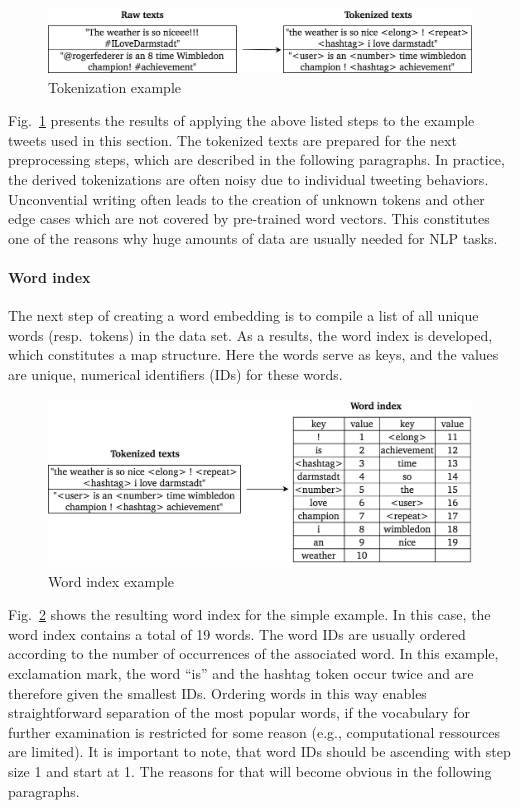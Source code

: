 \begin{figure}[h]
  \includegraphics[width=\textwidth]{img/text_preprocessing_1}
  \caption{Tokenization example}
\label{fig:tokenization}
\end{figure}

Fig.~\ref{fig:tokenization} presents the results of applying the above listed
steps to the example tweets used in this section.
The tokenized texts are prepared for the next preprocessing steps, which
are described in the following paragraphs.
In practice, the derived tokenizations are often noisy due to individual tweeting
behaviors.
Unconvential writing often leads to the creation of unknown tokens and other
edge cases which are not covered by pre-trained word vectors.
This constitutes one of the reasons why huge amounts of data are usually needed
for NLP tasks.

\paragraph{Word index}
\label{sub:word_index}

The next step of creating a word embedding is to compile a list of all unique
words (resp.\ tokens) in the data set.
As a results, the word index is developed, which constitutes a map structure.
Here the words serve as keys, and the values are unique, numerical identifiers
(IDs) for these words.

\begin{figure}[h]
  \includegraphics[width=\textwidth]{img/text_preprocessing_2}
  \caption{Word index example}
\label{fig:word_index}
\end{figure}

Fig.~\ref{fig:word_index} shows the resulting word index for the simple
example.
In this case, the word index contains a total of 19 words.
The word IDs are usually ordered according to the number of occurrences of the
associated word.
In this example, exclamation mark, the word ``is'' and the hashtag token occur
twice and are therefore given the smallest IDs.
Ordering words in this way enables straightforward separation of the most
popular words, if the vocabulary for further examination is restricted for some
reason (e.g., computational ressources are limited).
It is important to note, that word IDs should be ascending with step size 1 and
start at 1.
The reasons for that will become obvious in the following paragraphs.

